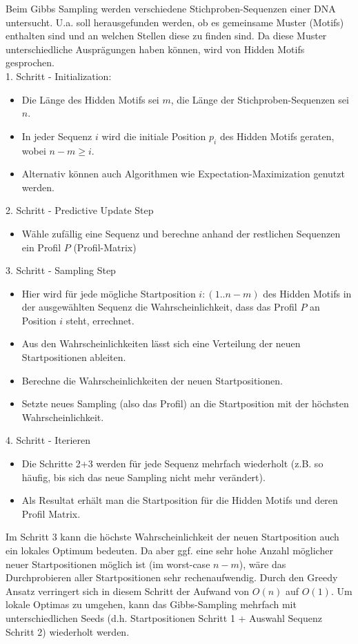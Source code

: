 \documentclass{homework}
\begin{document}
\begin{enumerate}
Beim Gibbs Sampling werden verschiedene Stichproben-Sequenzen einer DNA untersucht. U.a. soll herausgefunden werden, ob es gemeinsame Muster (Motifs) enthalten sind und an welchen Stellen diese zu finden sind. Da diese Muster unterschiedliche Ausprägungen haben können, wird von Hidden Motifs gesprochen.\\
1. Schritt - Initialization:
\begin{itemize}
	\item Die Länge des Hidden Motifs sei $m$, die Länge der Stichproben-Sequenzen sei $n$.
	\item In jeder Sequenz $i$ wird die initiale Position $p_i$ des Hidden Motifs geraten, wobei $n-m \geq i$.
	\item Alternativ können auch Algorithmen wie Expectation-Maximization genutzt werden.
\end{itemize}
2. Schritt - Predictive Update Step
\begin{itemize}
	\item Wähle zufällig eine Sequenz und berechne anhand der restlichen Sequenzen ein Profil $P$ (Profil-Matrix)
\end{itemize}
3. Schritt - Sampling Step
\begin{itemize}
	\item Hier wird für jede mögliche Startposition $i:(1..n-m)$ des Hidden Motifs in der ausgewählten Sequenz die Wahrscheinlichkeit, dass das Profil $P$ an Position $i$ steht, errechnet.
	\item Aus den Wahrscheinlichkeiten lässt sich eine Verteilung der neuen Startpositionen ableiten.
	\item Berechne die Wahrscheinlichkeiten der neuen Startpositionen.
	\item Setzte neues Sampling (also das Profil) an die Startposition mit der höchsten Wahrscheinlichkeit.
\end{itemize}
4. Schritt - Iterieren
\begin{itemize}
	\item Die Schritte 2+3 werden für jede Sequenz mehrfach wiederholt (z.B. so häufig, bis sich das neue Sampling nicht mehr verändert).
	\item Als Resultat erhält man die Startposition für die Hidden Motifs und deren Profil Matrix.
\end{itemize}

Im Schritt 3 kann die höchste Wahrscheinlichkeit der neuen Startposition auch ein lokales Optimum bedeuten.
Da aber ggf. eine sehr hohe Anzahl möglicher neuer Startpositionen möglich ist (im worst-case $n-m$),
wäre das Durchprobieren aller Startpositionen sehr rechenaufwendig.
Durch den Greedy Ansatz verringert sich in diesem Schritt der Aufwand von $O(n)$ auf $O(1)$.
Um lokale Optimas zu umgehen, kann das Gibbs-Sampling mehrfach mit unterschiedlichen Seeds (d.h. Startpositionen Schritt 1 + Auswahl Sequenz Schritt 2) wiederholt werden. 


\end{enumerate}
\end{document}
